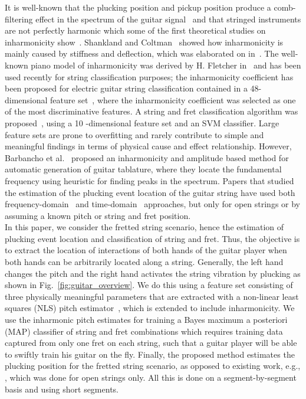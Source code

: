 \documentclass{article}
\begin{document}
It is well-known that the plucking position and pickup position produce a comb-filtering effect in the spectrum of the guitar signal~\cite{fletcher:plucked_strings,fletcher:principles_of_vibration_and_sound} and that stringed instruments are not perfectly harmonic which some of the first theoretical studies on inharmonicity show~\cite{donkin:acoustics,rayleigh:sound}. Shankland and Coltman~\cite{coltShank} showed how inharmonicity is mainly caused by stiffness and deflection, which was elaborated on in~\cite{rossing:science_of_string_instruments}. The well-known piano model of inharmonicity was derived by H. Fletcher in~\cite{fletcher:piano_model} and has been used recently for string classification purposes; the inharmonicity coefficient has been proposed for electric guitar string classification contained in a 48-dimensional feature set~\cite{abesser:automatic_string_detection_ml}, where the inharmonicity coefficient was selected as one of the most discriminative features. A string and fret classification algorithm was proposed~\cite{dittmar:realtime_string_detection}, using a 10
-dimensional feature set and an SVM classifier. Large feature sets are prone to overfitting and rarely contribute to simple and meaningful findings in terms of physical cause and effect relationship. However, Barbancho et al.~\cite{barbancho:inharmonicity_tablature} proposed an inharmonicity and amplitude based method for automatic generation of guitar tablature, where they locate the fundamental frequency using heuristic for finding peaks in the spectrum. Papers that studied the estimation of the plucking event location of the guitar string have used both frequency-domain~\cite{DBLP:conf/icassp/MohamadDH17,traube:pluckin_point_dafx,traube2003extraction} and time-domain~\cite{penttinen2004time} approaches, but only for open strings or by assuming a known pitch or string and fret position. \\
%
\indent In this paper, we consider the fretted string scenario, hence the estimation of plucking event location and classification of string and fret. Thus, the objective is to extract the location of interactions of both hands of the guitar player when both hands can be arbitrarily located along a string. Generally, the left hand changes the pitch and the right hand activates the string vibration by plucking as shown in Fig.~\ref{fig:guitar_overview}. We do this using a feature set consisting of three physically meaningful parameters that are extracted with a non-linear least squares (NLS) pitch estimator~\cite{nielsen2017fast,multipitch,hansen2018parametric,DBLP:journals/sigpro/ChristensenSJJ08}, which is extended to include inharmonicity.  We use the inharmonic pitch estimates for training a Bayes maximum a posteriori (MAP) classifier of string and fret combinations which requires training data captured from only one fret on each string, such that a guitar player will be able to swiftly train his guitar on the fly.  Finally, the proposed method estimates the plucking position for the fretted string scenario, as opposed to existing work, e.g.,  \cite{traube:pluckin_point_dafx,DBLP:conf/icassp/MohamadDH17}, which was done for open strings only. All this is done on a segment-by-segment basis and using short segments.
\end{document}
